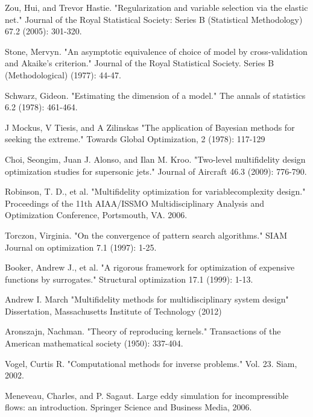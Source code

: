 \documentclass[a4paper,onecolumn]{article}
\theoremstyle{remark}
\begin{document}
\begin{thebibliography}{9}
Zou, Hui, and Trevor Hastie. 
"Regularization and variable selection via the elastic net." 
Journal of the Royal Statistical Society: Series B (Statistical Methodology) 67.2 (2005): 301-320.

Stone, Mervyn. 
"An asymptotic equivalence of choice of model by cross-validation and Akaike's criterion." 
Journal of the Royal Statistical Society. Series B (Methodological) (1977): 44-47.

Schwarz, Gideon. 
"Estimating the dimension of a model." 
The annals of statistics 6.2 (1978): 461-464.

J Mockus, V Tiesis, and A Zilinskas
"The application of Bayesian methods for seeking the extreme."
Towards Global Optimization, 2 (1978): 117-129

Choi, Seongim, Juan J. Alonso, and Ilan M. Kroo. 
"Two-level multifidelity design optimization studies for supersonic jets." 
Journal of Aircraft 46.3 (2009): 776-790.


Robinson, T. D., et al. 
"Multifidelity optimization for variablecomplexity design."
Proceedings of the 11th AIAA/ISSMO Multidisciplinary Analysis and Optimization Conference, 
Portsmouth, VA. 2006.

Torczon, Virginia. 
"On the convergence of pattern search algorithms." 
SIAM Journal on optimization 7.1 (1997): 1-25.

Booker, Andrew J., et al. 
"A rigorous framework for optimization of expensive functions by surrogates." 
Structural optimization 17.1 (1999): 1-13.

Andrew I. March
"Multifidelity methods for multidisciplinary system design"
Dissertation, Massachusetts Institute of Technology (2012)

Aronszajn, Nachman. 
"Theory of reproducing kernels." 
Transactions of the American mathematical society (1950): 337-404.

Vogel, Curtis R. 
"Computational methods for inverse problems."
Vol. 23. Siam, 2002.

Meneveau, Charles, and P. Sagaut. 
Large eddy simulation for incompressible flows: an introduction.
Springer Science and Business Media, 2006.


\end{thebibliography}
\end{document}
